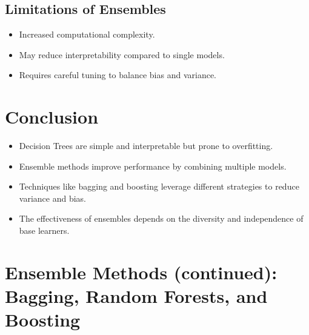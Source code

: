 \documentclass{article}
\begin{document}
\subsection{Limitations of Ensembles}

\begin{itemize}
    \item Increased computational complexity.
    \item May reduce interpretability compared to single models.
    \item Requires careful tuning to balance bias and variance.
\end{itemize}

\section{Conclusion}

\begin{itemize}
    \item Decision Trees are simple and interpretable but prone to overfitting.
    \item Ensemble methods improve performance by combining multiple models.
    \item Techniques like bagging and boosting leverage different strategies to reduce variance and bias.
    \item The effectiveness of ensembles depends on the diversity and independence of base learners.
\end{itemize}

\section{Ensemble Methods (continued): Bagging, Random Forests, and Boosting}
\end{document}
